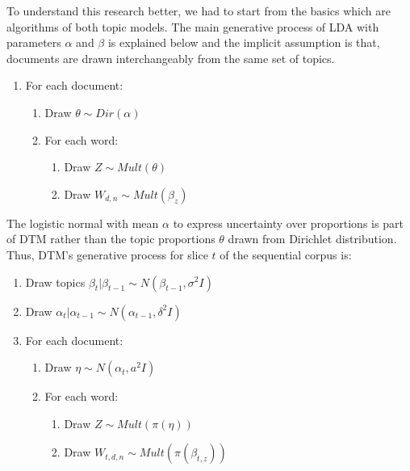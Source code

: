 \documentclass[a4paper]{report}
\begin{document}
To understand this research better, we had to start from the basics which are algorithms of both topic models. The main generative process of LDA with parameters $\alpha$ and $\beta$ is explained below and the implicit assumption is that, documents are drawn interchangeably from the same set of topics.
\begin{enumerate}
\item For each document:
\begin{enumerate}
\item  Draw $\theta \sim Dir(\alpha)$
\item For each word:
\begin{enumerate}
\item Draw $ Z \sim Mult (\theta) $
\item Draw $ W_{d, n} \sim Mult(\beta_z)$
\end{enumerate}
\end{enumerate}
\end{enumerate}

The logistic normal with mean $ \alpha $ to express uncertainty over proportions is part of DTM rather than the topic proportions $\theta$ drawn from Dirichlet distribution. Thus, DTM's generative process for slice $t$ of the sequential corpus is:

\begin{enumerate}
\item Draw topics $ \beta_t | \beta_{t-1}  \sim N(\beta_{t-1}, \sigma^2I) $
\item Draw $ \alpha_t | \alpha_{t-1}  \sim N(\alpha_{t-1}, \delta^2I) $
\item For each document:
\begin{enumerate}
\item Draw $ \eta \sim N(\alpha_t, a^2I)$
\item For each word:
\begin{enumerate}
\item Draw $Z \sim Mult(\pi(\eta)) $
\item Draw $W_{t,d,n} \sim Mult(\pi(\beta_{t,z})) $
\end{enumerate}
\end{enumerate}
\end{enumerate}
\end{document}
